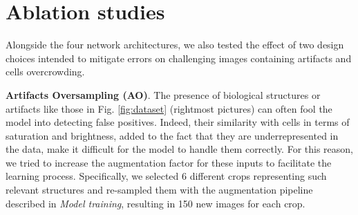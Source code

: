 \section{Ablation studies}
\label{sec:ablation_studies}

Alongside the four network architectures, we also tested the effect of two design choices intended to mitigate errors on challenging images containing artifacts and cells overcrowding.

\noindent\textbf{Artifacts Oversampling (AO)}. 
The presence of biological structures or artifacts like those in Fig. \ref{fig:dataset} (rightmost pictures) can often fool the model into detecting false positives. Indeed, their similarity with cells in terms of saturation and brightness, added to the fact that they are underrepresented in the data, make it difficult for the model to handle them correctly.
For this reason, we tried to increase the augmentation factor for these inputs to facilitate the learning process. Specifically, we selected 6 different crops representing such relevant structures and re-sampled them with the augmentation pipeline described in \textit{Model training}, resulting in 150 new images for each crop. 

